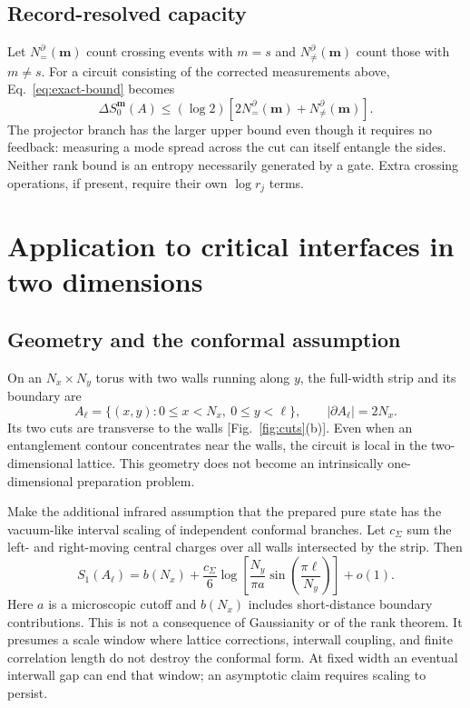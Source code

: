 \documentclass[aps,prb,onecolumn,nofootinbib,superscriptaddress]{revtex4-2}
\begin{document}
\subsection{Record-resolved capacity}
Let $N_=^\partial(\boldsymbol m)$ count crossing events with $m=s$ and
$N_{\ne}^\partial(\boldsymbol m)$ count those with $m\ne s$. For a circuit
consisting of the corrected measurements above, Eq.~\eqref{eq:exact-bound}
becomes
\begin{equation}
 \Delta S_0^{\boldsymbol m}(A)\leq
 (\log2)\left[2N_=^\partial(\boldsymbol m)
                   +N_{\ne}^\partial(\boldsymbol m)\right].
 \label{eq:record-bound}
\end{equation}
The projector branch has the larger upper bound even though it requires
no feedback: measuring a mode spread across the cut can itself entangle
the sides. Neither rank bound is an entropy necessarily generated by a gate.
Extra crossing operations, if present, require their own $\log r_j$ terms.

\section{Application to critical interfaces in two dimensions}
\label{sec:interface}
\subsection{Geometry and the conformal assumption}
On an $N_x\times N_y$ torus with two walls running along $y$, the full-width
strip and its boundary are
\begin{equation}
 A_\ell=\{(x,y):0\leq x<N_x,\ 0\leq y<\ell\},\qquad
 |\partial A_\ell|=2N_x .
 \label{eq:strip}
\end{equation}
Its two cuts are transverse to the walls [Fig.~\ref{fig:cuts}(b)]. Even
when an entanglement contour concentrates near the walls, the circuit is
local in the two-dimensional lattice. This geometry does not become an
intrinsically one-dimensional preparation problem.

Make the additional infrared assumption that the prepared pure state has
the vacuum-like interval scaling of independent conformal branches.
Let $c_\Sigma$ sum the left- and right-moving central charges over all
walls intersected by the strip. Then
\cite{CalabreseCardy2004,CastroDetournayIqbalPerlmutter2014}
\begin{equation}
 S_1(A_\ell)=b(N_x)+\frac{c_\Sigma}{6}
 \log\!\left[\frac{N_y}{\pi a}
       \sin\!\left(\frac{\pi\ell}{N_y}\right)\right]+o(1).
 \label{eq:cft}
\end{equation}
Here $a$ is a microscopic cutoff and $b(N_x)$ includes short-distance
boundary contributions. This is not a consequence of Gaussianity or of
the rank theorem. It presumes a scale window where lattice corrections,
interwall coupling, and finite correlation length do not destroy the
conformal form. At fixed width an eventual interwall gap can end that
window; an asymptotic claim requires scaling to persist.
\end{document}
